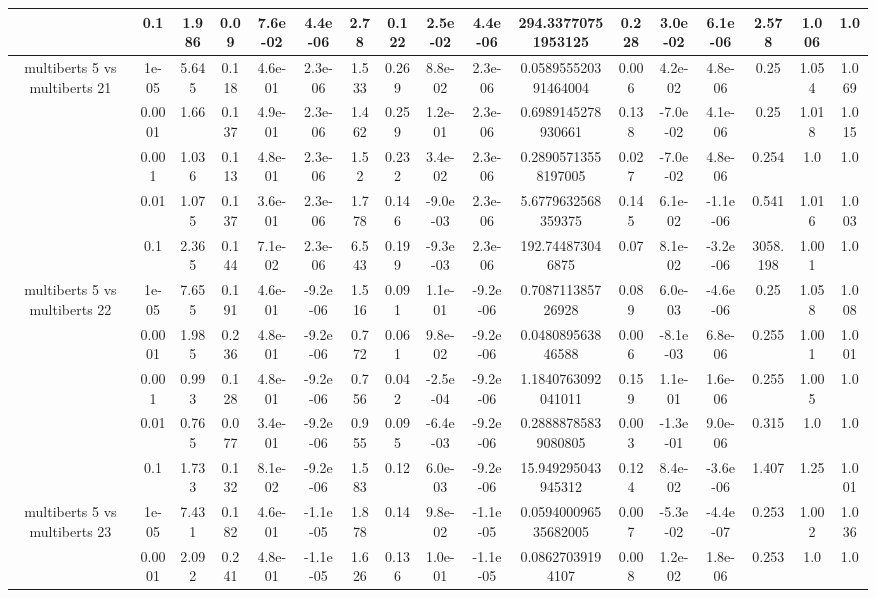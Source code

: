 \begin{tabular}{|c|c|c|c|c|c|c|c|c|c|c|c|c|c|c|c|c|}
 & 0.1 & 1.986 & 0.09 & 7.6e-02 & 4.4e-06 & 2.78 & 0.122 & 2.5e-02 & 4.4e-06 & 294.33770751953125 & 0.228 & 3.0e-02 & 6.1e-06 & 2.578 & 1.006 & 1.0 \\
\hline
\multirow{5}{*}{multiberts 5 vs multiberts 21} & 1e-05 & 5.645 & 0.118 & 4.6e-01 & 2.3e-06 & 1.533 & 0.269 & 8.8e-02 & 2.3e-06 & 0.058955520391464004 & 0.006 & 4.2e-02 & 4.8e-06 & 0.25 & 1.054 & 1.069 \\
 & 0.0001 & 1.66 & 0.137 & 4.9e-01 & 2.3e-06 & 1.462 & 0.259 & 1.2e-01 & 2.3e-06 & 0.6989145278930661 & 0.138 & -7.0e-02 & 4.1e-06 & 0.25 & 1.018 & 1.015 \\
 & 0.001 & 1.036 & 0.113 & 4.8e-01 & 2.3e-06 & 1.52 & 0.232 & 3.4e-02 & 2.3e-06 & 0.28905713558197005 & 0.027 & -7.0e-02 & 4.8e-06 & 0.254 & 1.0 & 1.0 \\
 & 0.01 & 1.075 & 0.137 & 3.6e-01 & 2.3e-06 & 1.778 & 0.146 & -9.0e-03 & 2.3e-06 & 5.6779632568359375 & 0.145 & 6.1e-02 & -1.1e-06 & 0.541 & 1.016 & 1.003 \\
 & 0.1 & 2.365 & 0.144 & 7.1e-02 & 2.3e-06 & 6.543 & 0.199 & -9.3e-03 & 2.3e-06 & 192.744873046875 & 0.07 & 8.1e-02 & -3.2e-06 & 3058.198 & 1.001 & 1.0 \\
\hline
\multirow{5}{*}{multiberts 5 vs multiberts 22} & 1e-05 & 7.655 & 0.191 & 4.6e-01 & -9.2e-06 & 1.516 & 0.091 & 1.1e-01 & -9.2e-06 & 0.708711385726928 & 0.089 & 6.0e-03 & -4.6e-06 & 0.25 & 1.058 & 1.008 \\
 & 0.0001 & 1.985 & 0.236 & 4.8e-01 & -9.2e-06 & 0.772 & 0.061 & 9.8e-02 & -9.2e-06 & 0.048089563846588 & 0.006 & -8.1e-03 & 6.8e-06 & 0.255 & 1.001 & 1.001 \\
 & 0.001 & 0.993 & 0.128 & 4.8e-01 & -9.2e-06 & 0.756 & 0.042 & -2.5e-04 & -9.2e-06 & 1.1840763092041011 & 0.159 & 1.1e-01 & 1.6e-06 & 0.255 & 1.005 & 1.0 \\
 & 0.01 & 0.765 & 0.077 & 3.4e-01 & -9.2e-06 & 0.955 & 0.095 & -6.4e-03 & -9.2e-06 & 0.28888785839080805 & 0.003 & -1.3e-01 & 9.0e-06 & 0.315 & 1.0 & 1.0 \\
 & 0.1 & 1.733 & 0.132 & 8.1e-02 & -9.2e-06 & 1.583 & 0.12 & 6.0e-03 & -9.2e-06 & 15.949295043945312 & 0.124 & 8.4e-02 & -3.6e-06 & 1.407 & 1.25 & 1.001 \\
\hline
\multirow{5}{*}{multiberts 5 vs multiberts 23} & 1e-05 & 7.431 & 0.182 & 4.6e-01 & -1.1e-05 & 1.878 & 0.14 & 9.8e-02 & -1.1e-05 & 0.059400096535682005 & 0.007 & -5.3e-02 & -4.4e-07 & 0.253 & 1.002 & 1.036 \\
 & 0.0001 & 2.092 & 0.241 & 4.8e-01 & -1.1e-05 & 1.626 & 0.136 & 1.0e-01 & -1.1e-05 & 0.08627039194107 & 0.008 & 1.2e-02 & 1.8e-06 & 0.253 & 1.0 & 1.0 \\

\end{tabular}
